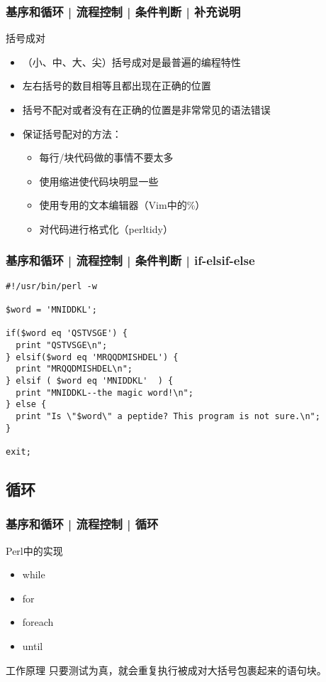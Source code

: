 \begin{frame}
  \frametitle{基序和循环 | 流程控制 | 条件判断 | 补充说明}
  \begin{block}{括号成对}
    \begin{itemize}
	\item （小、中、大、尖）括号成对是最普遍的编程特性
	\item 左右括号的数目相等且都出现在正确的位置
	\item 括号不配对或者没有在正确的位置是非常常见的语法错误
	\item 保证括号配对的方法：
	  \begin{itemize}
	    \item 每行/块代码做的事情不要太多
	    \item 使用缩进使代码块明显一些
	    \item 使用专用的文本编辑器（Vim中的\%）
	    \item 对代码进行格式化（perltidy）
	  \end{itemize}
    \end{itemize}
  \end{block}
\end{frame}

\begin{frame}[fragile]
  \frametitle{基序和循环 | 流程控制 | 条件判断 | \alert{if-elsif-else}}
\begin{lstlisting}
#!/usr/bin/perl -w

$word = 'MNIDDKL';

if($word eq 'QSTVSGE') {
  print "QSTVSGE\n";
} elsif($word eq 'MRQQDMISHDEL') {
  print "MRQQDMISHDEL\n";
} elsif ( $word eq 'MNIDDKL'  ) {
  print "MNIDDKL--the magic word!\n";
} else {
  print "Is \"$word\" a peptide? This program is not sure.\n";
}

exit;
\end{lstlisting}
\end{frame}

\subsection{循环}
\begin{frame}
  \frametitle{基序和循环 | 流程控制 | 循环}
  \begin{block}{\alert{Perl中的实现}}
    \begin{itemize}
      \item while
      \item for
      \item foreach
      \item until
    \end{itemize}
  \end{block}
  \pause
  \begin{block}{工作原理}
    只要测试为真，就会重复执行被成对大括号包裹起来的语句块。
  \end{block}
\end{frame}


